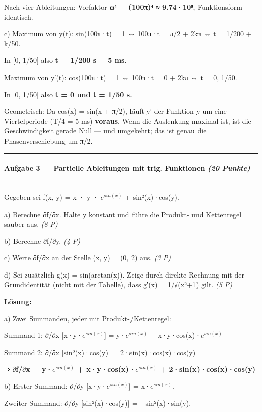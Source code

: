 \documentclass[11pt, a4paper]{article}
\begin{document}
Nach vier Ableitungen: Vorfaktor \textbf{ω⁴ = (100π)⁴ ≈ 9.74·10⁸}, Funktionsform identisch.


c) Maximum von y(t): sin(100π·t) = 1 ⇔ 100π·t = π/2 + 2kπ ⇔ t = 1/200 + k/50.

In [0, 1/50] also \textbf{t = 1/200 s = 5 ms}.


Maximum von y′(t): cos(100π·t) = 1 ⇔ 100π·t = 0 + 2kπ ⇔ t = 0, 1/50.

In [0, 1/50] also \textbf{t = 0 und t = 1/50 s}.


Geometrisch: Da cos(x) = sin(x + π/2), läuft y′ der Funktion y um eine Viertelperiode (T/4 = 5 ms) \textbf{voraus}. Wenn die Auslenkung maximal ist, ist die Geschwindigkeit gerade Null — und umgekehrt; das ist genau die Phasenverschiebung um π/2.



\noindent\textcolor{rulegray}{\rule{\linewidth}{0.4pt}}


\paragraph{Aufgabe 3 — Partielle Ableitungen mit trig. Funktionen \textit{(20 Punkte)}}\mbox{}\\[2pt]

Gegeben sei f(x, y) = x · y · $e^{sin(x)}$ + sin²(x)·cos(y).


a) Berechne ∂f/∂x. Halte y konstant und führe die Produkt- und Kettenregel sauber aus. \textit{(8 P)}


b) Berechne ∂f/∂y. \textit{(4 P)}


c) Werte ∂f/∂x an der Stelle (x, y) = (0, 2) aus. \textit{(3 P)}


d) Sei zusätzlich g(x) = sin(arctan(x)). Zeige durch direkte Rechnung mit der Grundidentität (nicht mit der Tabelle), dass g′(x) = 1/√(x²+1) gilt. \textit{(5 P)}


\textbf{Lösung:}


a) Zwei Summanden, jeder mit Produkt-/Kettenregel:


Summand 1: ∂/∂x [x·y·$e^{sin(x)}$] = y·$e^{sin(x)}$ + x·y·cos(x)·$e^{sin(x)}$

Summand 2: ∂/∂x [sin²(x)·cos(y)] = 2·sin(x)·cos(x)·cos(y)


⇒ \textbf{∂f/∂x = y·$e^{sin(x)}$ + x·y·cos(x)·$e^{sin(x)}$ + 2·sin(x)·cos(x)·cos(y)}


b) Erster Summand: ∂/∂y [x·y·$e^{sin(x)}$] = x·$e^{sin(x)}$.

Zweiter Summand: ∂/∂y [sin²(x)·cos(y)] = −sin²(x)·sin(y).
\end{document}
